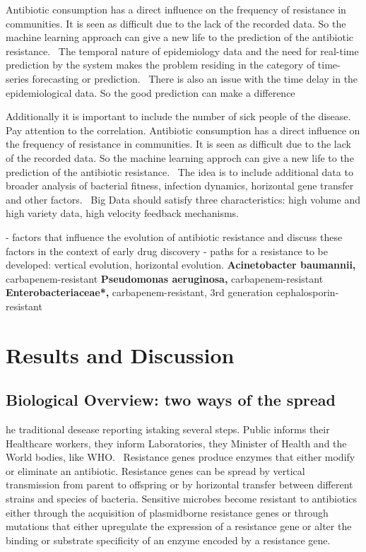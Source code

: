 \documentclass[12pt]{article}
\begin{document}
Antibiotic consumption has a direct influence on the frequency of resistance in communities. It is seen as difficult due to the lack of the recorded data. So the machine learning approach can give a new life to the prediction of the antibiotic resistance.~\cite{Austin.}
The temporal nature of epidemiology data and the need for real-time prediction by the system makes the problem residing in the category of time-series forecasting or prediction.~\cite{Cho.03.06.2014b} There is also an issue with the time delay in the epidemiological data. So the good prediction can make a difference~\cite{Harvard.}

Additionally it is important to include the number of sick people of the disease. Pay attention to the correlation.
Antibiotic consumption has a direct influence on the frequency of resistance in communities. It is seen as difficult due to the lack of the recorded data. So the machine learning approch can give a new life to the prediction of the antibiotic resistance.~\cite{Austin.}
The idea is to include additional data to broader analysis of bacterial fitness, infection dynamics, horizontal gene transfer and other factors.~\cite[S.~689]{Sommer.2017b}
Big Data should satisfy three characteristics: high volume and high variety data, high velocity feedback mechanisms.~\cite{Mooney.2015}

- factors that influence the evolution of antibiotic resistance and discuss these factors in the context of early drug discovery - paths for a resistance to be developed: vertical evolution, horizontal evolution.
\textbf{Acinetobacter baumannii, }carbapenem-resistant
\textbf{Pseudomonas aeruginosa, }carbapenem-resistant \textbf{Enterobacteriaceae*, }carbapenem-resistant, 3rd generation cephalosporin-resistant~\cite{Tacconelli.}

\section{Results and Discussion}
\subsection{Biological Overview: two ways of the spread}
he traditional desease reporting istaking several steps. Public informs their Healthcare workers, they inform Laboratories, they Minister of Health and the World bodies, like WHO.~\cite{Harvard.}
Resistance genes produce enzymes that either modify or eliminate an antibiotic. Resistance genes can be spread by vertical transmission from parent to offspring or by horizontal transfer between different strains and species of bacteria. Sensitive microbes become resistant to antibiotics either through the acquisition of plasmidborne resistance genes or through mutations that either upregulate the expression of a resistance gene or alter the binding or substrate specificity of an enzyme encoded by a resistance gene.~\cite[S.~1237]{Barlow.2003}
\end{document}
